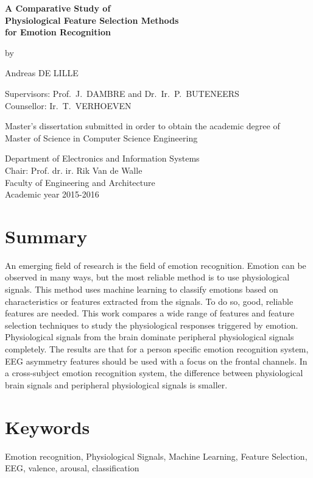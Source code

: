 
\newpage
{}
{
\setlength{\baselineskip}{14pt}
\setlength{\parindent}{0pt}
\setlength{\parskip}{8pt}

\begin{center}

\textbf{\huge
A Comparative Study of \\
Physiological Feature Selection Methods \\
for Emotion Recognition\\
}

by

Andreas DE LILLE

\end{center}

Supervisors: Prof.~J.~DAMBRE and Dr.~Ir.~P.~BUTENEERS \\
Counsellor: Ir.~T.~VERHOEVEN

Master's dissertation submitted in order to obtain the academic degree of\\
Master of Science in Computer Science Engineering

Department of Electronics and Information Systems\\
Chair: Prof. dr. ir. Rik Van de Walle\\
Faculty of Engineering and Architecture\\
Academic year 2015-2016\\



\section*{Summary}

An emerging field of research is the field of emotion recognition. Emotion can be observed in many ways, but the most reliable method is to use physiological signals. This method uses machine learning to classify emotions based on characteristics or features extracted from the signals. To do so, good, reliable features are needed. This work compares a wide range of features and feature selection techniques to study the physiological responses triggered by emotion.
\npar
Physiological signals from the brain dominate peripheral physiological signals completely. The results are that for a person specific emotion recognition system, EEG asymmetry features should be used with a focus on the frontal channels. In a cross-subject emotion recognition system, the difference between physiological brain signals and peripheral physiological signals is smaller.

\section*{Keywords}

Emotion recognition, Physiological Signals, Machine Learning, Feature Selection, EEG, valence, arousal, classification
}

\newpage %
